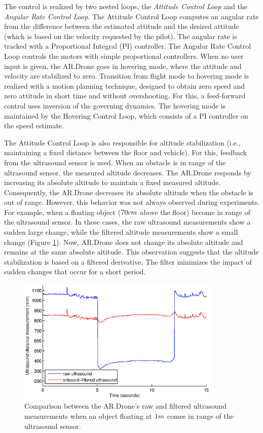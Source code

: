 The control is realized by two nested loops, the \textit{Attitude Control Loop} and the \textit{Angular Rate Control Loop}.
The Attitude Control Loop computes an angular rate from the difference between the estimated attitude and the desired attitude (which is based on the velocity requested by the pilot).
The angular rate is tracked with a Proportional Integral (PI) controller.
The Angular Rate Control Loop controls the motors with simple proportional controllers.
When no user input is given, the AR.Drone goes in hovering mode, where the attitude and velocity are stabilized to zero.
Transition from flight mode to hovering mode is realized with a motion planning technique, designed to obtain zero speed and zero attitude in short time and without overshooting.
For this, a feed-forward control uses inversion of the governing dynamics.
The hovering mode is maintained by the Hovering Control Loop, which consists of a PI controller on the speed estimate.

The Attitude Control Loop is also responsible for altitude stabilization (i.e., maintaining a fixed distance between the floor and vehicle).
For this, feedback from the ultrasound sensor is used.
When an obstacle is in range of the ultrasound sensor, the measured altitude decreases.
The AR.Drone responds by increasing its absolute altitude to maintain a fixed measured altitude.
Consequently, the AR.Drone decreases its absolute altitude when the obstacle is out of range.
However, this behavior was not always observed during experiments.
For example, when a floating object ($70\small{cm}$ above the floor) become in range of the ultrasound sensor.
In these cases, the raw ultrasound measurements show a sudden large change, while the filtered altitude measurements show a small change (Figure \ref{fig:platform-ultasound-raw-filtered}).
Now, AR.Drone does not change its absolute altitude and remains at the same absolute altitude.
This observation suggests that the altitude stabilization is based on a filtered derivative.
The filter minimizes the impact of sudden changes that occur for a short period.

\begin{figure}[htb]
\centering
\includegraphics[height=6cm]{images/altitude_raw_vs_filtered_1m_obstacle.eps}
\caption{Comparison between the AR.Drone's raw and filtered ultrasound measurements when an object floating at  $1\small{m}$ comes in range of the ultrasound sensor.}
\label{fig:platform-ultasound-raw-filtered}
\end{figure}

